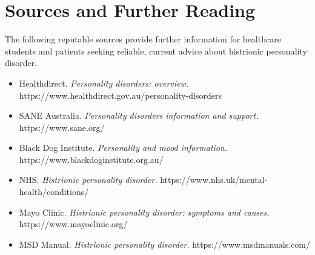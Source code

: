 \section*{Sources and Further Reading}
The following reputable sources provide further information for healthcare students and patients seeking reliable, current advice about histrionic personality disorder.

\begin{itemize}
    \item Healthdirect. \textit{Personality disorders: overview.} https://www.healthdirect.gov.au/personality-disorders
    \item SANE Australia. \textit{Personality disorders information and support.} https://www.sane.org/
    \item Black Dog Institute. \textit{Personality and mood information.} https://www.blackdoginstitute.org.au/
    \item NHS. \textit{Histrionic personality disorder.} https://www.nhs.uk/mental-health/conditions/
    \item Mayo Clinic. \textit{Histrionic personality disorder: symptoms and causes.} https://www.mayoclinic.org/
    \item MSD Manual. \textit{Histrionic personality disorder.} https://www.msdmanuals.com/
\end{itemize}
